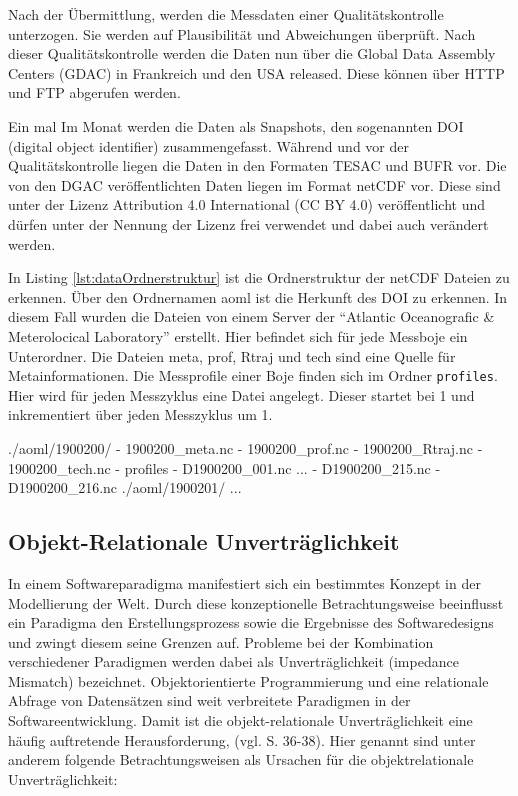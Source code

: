     Nach der Übermittlung, werden die Messdaten einer Qualitätskontrolle unterzogen. Sie werden auf Plausibilität und Abweichungen überprüft. Nach dieser Qualitätskontrolle werden die Daten nun über die Global Data Assembly Centers (GDAC) in Frankreich und den USA released. Diese können über HTTP und FTP abgerufen werden. 
    
    Ein mal Im Monat werden die Daten als Snapshots, den sogenannten DOI (digital object identifier) zusammengefasst. 
    Während und vor der Qualitätskontrolle liegen die Daten in den Formaten TESAC und BUFR vor. 
    Die von den DGAC veröffentlichten Daten liegen im Format netCDF vor. Diese sind unter der Lizenz Attribution 4.0 International (CC BY 4.0) veröffentlicht und dürfen unter der Nennung der Lizenz frei verwendet und dabei auch verändert werden.
    
    \cite{ArgoDataDocumentation}
    

In Listing \ref{lst:dataOrdnerstruktur} ist die Ordnerstruktur der netCDF Dateien zu erkennen. Über den Ordnernamen aoml ist die Herkunft des DOI zu erkennen. In diesem Fall wurden die Dateien von einem Server der  "`Atlantic Oceanografic \& Meterolocical Laboratory"' erstellt. Hier befindet sich für jede Messboje ein Unterordner.  Die Dateien meta, prof, Rtraj und tech sind eine Quelle für Metainformationen. Die Messprofile einer Boje finden sich im Ordner \texttt{profiles}. Hier wird für jeden Messzyklus eine Datei angelegt. Dieser startet bei 1 und inkrementiert über jeden Messzyklus um 1.
    
    \begin{python}[label={lst:dataOrdnerstruktur}, caption={Die Verzeichnisstruktur der vom aoml bereitgestellten Daten}]
./aoml/1900200/
- 1900200_meta.nc
- 1900200_prof.nc
- 1900200_Rtraj.nc
- 1900200_tech.nc
- profiles
    - D1900200_001.nc
    ...
    - D1900200_215.nc
    - D1900200_216.nc
./aoml/1900201/
...\end{python}


\subsection{Objekt-Relationale Unverträglichkeit}

In einem Softwareparadigma manifestiert sich ein bestimmtes Konzept in der Modellierung der Welt. Durch diese konzeptionelle Betrachtungsweise beeinflusst ein Paradigma den Erstellungsprozess sowie die Ergebnisse des Softwaredesigns und zwingt diesem seine Grenzen auf. Probleme bei der Kombination verschiedener Paradigmen werden dabei als Unverträglichkeit (impedance Mismatch) bezeichnet.
Objektorientierte Programmierung  und eine relationale Abfrage von Datensätzen sind weit verbreitete Paradigmen in der Softwareentwicklung. Damit ist die objekt-relationale Unverträglichkeit eine häufig auftretende Herausforderung, (vgl. \cite{ireland2009classification} S. 36-38).
Hier genannt sind unter anderem folgende Betrachtungsweisen als Ursachen für die objektrelationale Unverträglichkeit:

